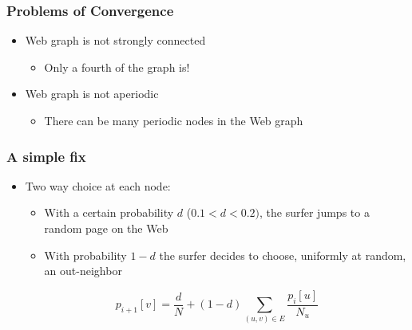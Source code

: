 \documentclass{beamer}
\begin{document}
\begin{frame}
  \frametitle{Problems of Convergence}

  \begin{itemize}
  \item Web graph is not strongly connected
    \begin{itemize}
    \item Only a fourth of the graph is!
    \end{itemize}
  \item Web graph is not aperiodic
      \begin{itemize}
      \item There can be many periodic nodes in the Web graph
      \end{itemize}
  \end{itemize}

\end{frame}


\begin{frame}
  \frametitle{A simple fix}

  \begin{itemize}
  \item Two way choice at each node:
    \begin{itemize}
    \item With a certain probability $d$ ($0.1 < d < 0.2)$, the surfer jumps to
      a random page on the Web
    \item With probability $1-d$ the surfer decides to choose, uniformly at
      random, an out-neighbor
    \end{itemize}
    \begin{block}{}
      \begin{displaymath}
        p_{i+1}[v] = \frac{d}{N} + (1-d)\sum_{(u,v) \in E}\frac{p_i[u]}{N_u}
      \end{displaymath}
    \end{block}
  \end{itemize}

\end{frame}

\end{document}
